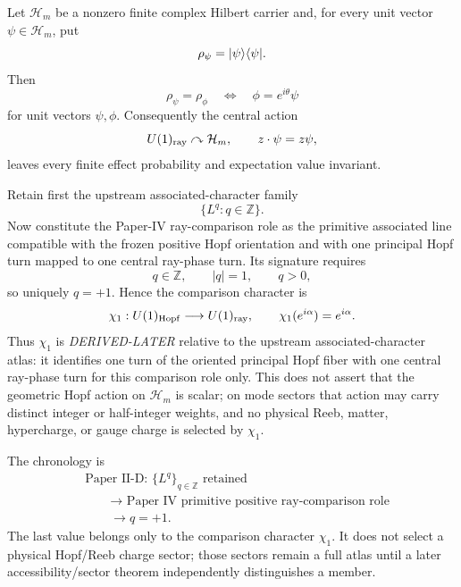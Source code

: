 \documentclass[12pt,a4paper]{article}
\begin{document}
\begin{theorem}
\label{p4:thm:hopf-ray-phase}
Let \(\mathcal H_m\) be a nonzero finite complex Hilbert carrier and, for every
unit vector \(\psi\in\mathcal H_m\), put
\[
\rho_\psi=\lvert \psi \rangle\langle \psi \rvert.
\]
Then
\[
\rho_\psi=\rho_\phi
\quad\Longleftrightarrow\quad
\phi=e^{i\theta}\psi
\]
for unit vectors \(\psi,\phi\).  Consequently the central action
\[
U(1)_{\rm ray}\curvearrowright\mathcal H_m,
\qquad
z\cdot\psi=z\psi,
\]
leaves every finite effect probability and expectation value invariant.

Retain first the upstream associated-character family
\[
\{L^q:q\in\mathbb Z\}.
\]
Now constitute the Paper-IV ray-comparison role as the primitive associated
line compatible with the frozen positive Hopf orientation and with one
principal Hopf turn mapped to one central ray-phase turn.  Its signature
requires
\[
q\in\mathbb Z,\qquad |q|=1,\qquad q>0,
\]
so uniquely \(q=+1\).  Hence the comparison character is
\[
\chi_1:U(1)_{\rm Hopf}\longrightarrow U(1)_{\rm ray},
\qquad
\chi_1(e^{i\alpha})=e^{i\alpha}.
\]
Thus \(\chi_1\) is \emph{DERIVED-LATER} relative to the upstream
associated-character atlas: it identifies one turn of the oriented principal
Hopf fiber with one central ray-phase turn for this comparison role only.
This does not assert that the geometric Hopf action on \(\mathcal H_m\) is
scalar; on mode sectors that action may carry distinct integer or half-integer
weights, and no physical Reeb, matter, hypercharge, or gauge charge is selected
by \(\chi_1\).
\end{theorem}

\begin{remark}
\label{p4:rem:ray-comparison-not-charge-selector}
The chronology is
\[
\begin{aligned}
&\text{Paper II-D: }\{L^q\}_{q\in\mathbb Z}\text{ retained}\\
&\qquad\longrightarrow\text{ Paper IV primitive positive ray-comparison role}\\
&\qquad\longrightarrow q=+1.
\end{aligned}
\]
The last value belongs only to the comparison character \(\chi_1\).  It does
not select a physical Hopf/Reeb charge sector; those sectors remain a full
atlas until a later accessibility/sector theorem independently distinguishes a
member.
\end{remark}
\end{document}
